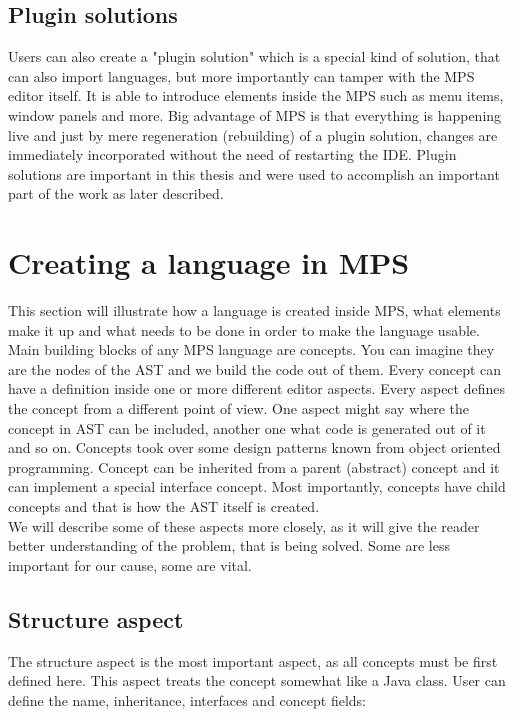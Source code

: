 \subsection{Plugin solutions}

Users can also create a "plugin solution" which is a special kind of solution, that can also import languages, but more importantly can tamper with the MPS editor itself.
It is able to introduce elements inside the MPS such as menu items, window panels and more.
Big advantage of MPS is that everything is happening live and just by mere regeneration (rebuilding) of a plugin solution, changes are immediately incorporated without the need of restarting the IDE.
Plugin solutions are important in this thesis and were used to accomplish an important part of the work as later described.

\section{Creating a language in MPS}

This section will illustrate how a language is created inside MPS, what elements make it up and what needs to be done in order to make the language usable.
\\

Main building blocks of any MPS language are concepts.
You can imagine they are the nodes of the AST and we build the code out of them.
Every concept can have a definition inside one or more different editor aspects.
Every aspect defines the concept from a different point of view.
One aspect might say where the concept in AST can be included, another one what code is generated out of it and so on.
Concepts took over some design patterns known from object oriented programming.
Concept can be inherited from a parent (abstract) concept and it can implement a special interface concept.
Most importantly, concepts have child concepts and that is how the AST itself is created.
\\

We will describe some of these aspects more closely, as it will give the reader better understanding of the problem, that is being solved.
Some are less important for our cause, some are vital.

\subsection{Structure aspect}
The structure aspect is the most important aspect, as all concepts must be first defined here.
This aspect treats the concept somewhat like a Java class. User can define the name, inheritance, interfaces and concept fields:

